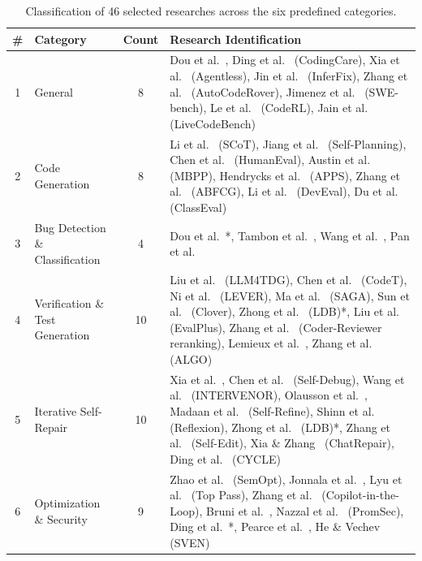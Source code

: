 \documentclass[10pt,a4paper]{article}
\begin{document}
\begin{table}[!t]
\centering
\caption{Classification of 46 selected researches across the six predefined categories.}
\label{tab:classification}
\small
\begin{tabular}{@{}clcp{7.5cm}@{}}
\toprule
\textbf{\#} & \textbf{Category} & \textbf{Count} & \textbf{Research Identification} \\
\midrule
1 & General & 8 & Dou et al.~\cite{dou2026}, Ding et al.~\cite{ding2025codingcare} (CodingCare), Xia et al.~\cite{xia2025agentless} (Agentless), Jin et al.~\cite{jin2023inferfix} (InferFix), Zhang et al.~\cite{zhang2024autocoderover} (AutoCodeRover), Jimenez et al.~\cite{jimenez2024swebench} (SWE-bench), Le et al.~\cite{le2022coderl} (CodeRL), Jain et al.~\cite{jain2024} (LiveCodeBench) \\
\midrule
2 & Code Generation & 8 & Li et al.~\cite{li2025scot} (SCoT), Jiang et al.~\cite{jiang2024selfplan} (Self-Planning), Chen et al.~\cite{chen2021humaneval} (HumanEval), Austin et al.~\cite{austin2021mbpp} (MBPP), Hendrycks et al.~\cite{hendrycks2021apps} (APPS), Zhang et al.~\cite{zhang2025abfcg} (ABFCG), Li et al.~\cite{li2024deveval} (DevEval), Du et al.~\cite{du2023classeval} (ClassEval) \\
\midrule
3 & Bug Detection \& Classification & 4 & Dou et al.~\cite{dou2026}*, Tambon et al.~\cite{tambon2025}, Wang et al.~\cite{wang2025where}, Pan et al.~\cite{pan2024lost} \\
\midrule
4 & Verification \& Test Generation & 10 & Liu et al.~\cite{liu2025llm4tdg} (LLM4TDG), Chen et al.~\cite{chenbei2023} (CodeT), Ni et al.~\cite{ni2023lever} (LEVER), Ma et al.~\cite{ma2025saga} (SAGA), Sun et al.~\cite{sun2024clover} (Clover), Zhong et al.~\cite{zhong2024ldb} (LDB)*, Liu et al.~\cite{liu2023evalplus} (EvalPlus), Zhang et al.~\cite{zhangt2023coderreviewer} (Coder-Reviewer reranking), Lemieux et al.~\cite{lemieux2023codamosa}, Zhang et al.~\cite{zhang2023algo} (ALGO) \\
\midrule
5 & Iterative Self-Repair & 10 & Xia et al.~\cite{xia2023apr}, Chen et al.~\cite{chen2023selfdebug} (Self-Debug), Wang et al.~\cite{wang2024intervenor} (INTERVENOR), Olausson et al.~\cite{olausson2024}, Madaan et al.~\cite{madaan2023} (Self-Refine), Shinn et al.~\cite{shinn2023} (Reflexion), Zhong et al.~\cite{zhong2024ldb} (LDB)*, Zhang et al.~\cite{zhang2023selfedit} (Self-Edit), Xia \& Zhang~\cite{xia2024chatrepair} (ChatRepair), Ding et al.~\cite{ding2024cycle} (CYCLE) \\
\midrule
6 & Optimization \& Security & 9 & Zhao et al.~\cite{zhao2025semopt} (SemOpt), Jonnala et al.~\cite{jonnala2025}, Lyu et al.~\cite{lyu2025toppass} (Top Pass), Zhang et al.~\cite{zhang2024copilot} (Copilot-in-the-Loop), Bruni et al.~\cite{bruni2025}, Nazzal et al.~\cite{nazzal2024promsec} (PromSec), Ding et al.~\cite{ding2025codingcare}*, Pearce et al.~\cite{pearce2022}, He \& Vechev~\cite{he2023sven} (SVEN) \\

\end{tabular}
\end{table}
\end{document}
